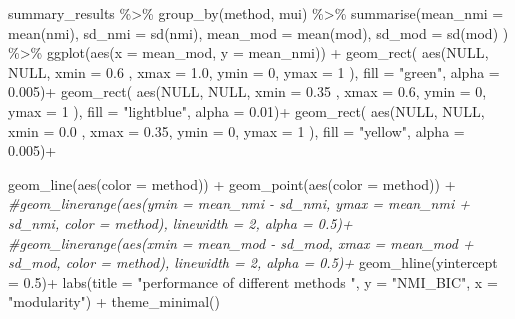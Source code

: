 \documentclass[
]{article}
\newenvironment{Shaded}{\begin{snugshade}}{\end{snugshade}}
\newcommand{\AttributeTok}[1]{\textcolor[rgb]{0.77,0.63,0.00}{#1}}
\newcommand{\CommentTok}[1]{\textcolor[rgb]{0.56,0.35,0.01}{\textit{#1}}}
\newcommand{\ConstantTok}[1]{\textcolor[rgb]{0.00,0.00,0.00}{#1}}
\newcommand{\DecValTok}[1]{\textcolor[rgb]{0.00,0.00,0.81}{#1}}
\newcommand{\FloatTok}[1]{\textcolor[rgb]{0.00,0.00,0.81}{#1}}
\newcommand{\FunctionTok}[1]{\textcolor[rgb]{0.00,0.00,0.00}{#1}}
\newcommand{\NormalTok}[1]{#1}
\newcommand{\SpecialCharTok}[1]{\textcolor[rgb]{0.00,0.00,0.00}{#1}}
\newcommand{\StringTok}[1]{\textcolor[rgb]{0.31,0.60,0.02}{#1}}
\begin{document}
\begin{Shaded}
\begin{Highlighting}[]
\NormalTok{summary\_results }\SpecialCharTok{\%\textgreater{}\%} \FunctionTok{group\_by}\NormalTok{(method, mui) }\SpecialCharTok{\%\textgreater{}\%} 
    \FunctionTok{summarise}\NormalTok{(}\AttributeTok{mean\_nmi =} \FunctionTok{mean}\NormalTok{(nmi), }\AttributeTok{sd\_nmi =} \FunctionTok{sd}\NormalTok{(nmi), }
              \AttributeTok{mean\_mod =} \FunctionTok{mean}\NormalTok{(mod), }\AttributeTok{sd\_mod =} \FunctionTok{sd}\NormalTok{(mod) ) }\SpecialCharTok{\%\textgreater{}\%}
    \FunctionTok{ggplot}\NormalTok{(}\FunctionTok{aes}\NormalTok{(}\AttributeTok{x =}\NormalTok{ mean\_mod, }\AttributeTok{y =}\NormalTok{ mean\_nmi)) }\SpecialCharTok{+}
    \FunctionTok{geom\_rect}\NormalTok{( }\FunctionTok{aes}\NormalTok{(}\ConstantTok{NULL}\NormalTok{, }\ConstantTok{NULL}\NormalTok{, }\AttributeTok{xmin =} \FloatTok{0.6}\NormalTok{ , }\AttributeTok{xmax =} \FloatTok{1.0}\NormalTok{, }\AttributeTok{ymin =} \DecValTok{0}\NormalTok{, }\AttributeTok{ymax =} \DecValTok{1}\NormalTok{ ), }\AttributeTok{fill =} \StringTok{"green"}\NormalTok{, }\AttributeTok{alpha =} \FloatTok{0.005}\NormalTok{)}\SpecialCharTok{+}
    \FunctionTok{geom\_rect}\NormalTok{( }\FunctionTok{aes}\NormalTok{(}\ConstantTok{NULL}\NormalTok{, }\ConstantTok{NULL}\NormalTok{, }\AttributeTok{xmin =} \FloatTok{0.35}\NormalTok{ , }\AttributeTok{xmax =} \FloatTok{0.6}\NormalTok{, }\AttributeTok{ymin =} \DecValTok{0}\NormalTok{, }\AttributeTok{ymax =} \DecValTok{1}\NormalTok{ ), }\AttributeTok{fill =} \StringTok{"lightblue"}\NormalTok{, }\AttributeTok{alpha =} \FloatTok{0.01}\NormalTok{)}\SpecialCharTok{+}
    \FunctionTok{geom\_rect}\NormalTok{( }\FunctionTok{aes}\NormalTok{(}\ConstantTok{NULL}\NormalTok{, }\ConstantTok{NULL}\NormalTok{, }\AttributeTok{xmin =} \FloatTok{0.0}\NormalTok{ , }\AttributeTok{xmax =} \FloatTok{0.35}\NormalTok{, }\AttributeTok{ymin =} \DecValTok{0}\NormalTok{, }\AttributeTok{ymax =} \DecValTok{1}\NormalTok{ ), }\AttributeTok{fill =} \StringTok{"yellow"}\NormalTok{, }\AttributeTok{alpha =} \FloatTok{0.005}\NormalTok{)}\SpecialCharTok{+}

      \FunctionTok{geom\_line}\NormalTok{(}\FunctionTok{aes}\NormalTok{(}\AttributeTok{color =}\NormalTok{ method)) }\SpecialCharTok{+}
    \FunctionTok{geom\_point}\NormalTok{(}\FunctionTok{aes}\NormalTok{(}\AttributeTok{color =}\NormalTok{ method)) }\SpecialCharTok{+}
    \CommentTok{\#geom\_linerange(aes(ymin = mean\_nmi {-} sd\_nmi, ymax = mean\_nmi + sd\_nmi, color = method), linewidth = 2, alpha = 0.5)+}
    \CommentTok{\#geom\_linerange(aes(xmin = mean\_mod {-} sd\_mod, xmax = mean\_mod + sd\_mod, color = method), linewidth = 2, alpha = 0.5)+}
      \FunctionTok{geom\_hline}\NormalTok{(}\AttributeTok{yintercept =} \FloatTok{0.5}\NormalTok{)}\SpecialCharTok{+}
    \FunctionTok{labs}\NormalTok{(}\AttributeTok{title =} \StringTok{"performance of different methods "}\NormalTok{, }\AttributeTok{y =} \StringTok{"NMI\_BIC"}\NormalTok{, }\AttributeTok{x =} \StringTok{"modularity"}\NormalTok{) }\SpecialCharTok{+}
    \FunctionTok{theme\_minimal}\NormalTok{()  }
\end{Highlighting}
\end{Shaded}
\end{document}
